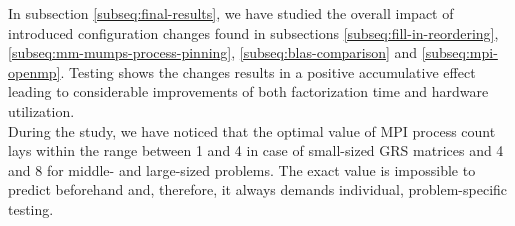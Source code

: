 In subsection \ref{subseq:final-results}, we have studied the overall impact of introduced configuration changes found in subsections \ref{subseq:fill-in-reordering}, \ref{subseq:mm-mumps-process-pinning}, \ref{subseq:blas-comparison} and \ref{subseq:mpi-openmp}. Testing shows the changes results in a positive accumulative effect leading to considerable improvements of both factorization time and hardware utilization.\\



During the study, we have noticed that the optimal value of MPI process count lays within the range between 1 and 4 in case of small-sized GRS matrices and 4 and 8 for middle- and large-sized problems. The exact value is impossible to predict beforehand and, therefore, it always demands individual, problem-specific testing.\\
